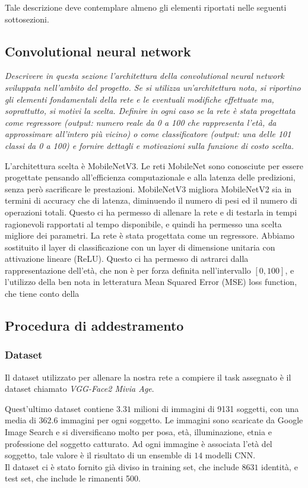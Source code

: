 Tale descrizione deve contemplare almeno gli elementi riportati nelle seguenti
sottosezioni.

\subsection{Convolutional neural network}
\emph{Descrivere in questa sezione l’architettura della convolutional neural network
sviluppata nell’ambito del progetto. Se si utilizza un’architettura nota, si riportino gli elementi fondamentali della rete e le eventuali modifiche effettuate ma, soprattutto, si motivi la scelta.
Definire in ogni caso se la rete è stata progettata come regressore (output:
numero reale da 0 a 100 che rappresenta l’età, da approssimare all’intero più
vicino) o come classificatore (output: una delle 101 classi da 0 a 100) e fornire dettagli e motivazioni sulla funzione di costo scelta.}

L'architettura scelta è MobileNetV3. Le reti MobileNet sono conosciute per essere progettate pensando all'efficienza computazionale e alla latenza delle predizioni, senza però sacrificare le prestazioni. MobileNetV3 migliora MobileNetV2 sia in termini di accuracy che di latenza, diminuendo il numero di pesi ed il numero di operazioni totali. Questo ci ha permesso di allenare la rete e di testarla in tempi ragionevoli rapportati al tempo disponibile, e quindi ha permesso una scelta migliore dei parametri.
La rete è stata progettata come un regressore. Abbiamo sostituito il layer di classificazione con un layer di dimensione unitaria con attivazione lineare (ReLU). Questo ci ha permesso di astrarci dalla rappresentazione dell'età, che non è per forza definita nell'intervallo \([0, 100]\), e l'utilizzo della ben nota in letteratura Mean Squared Error (MSE) loss function, che tiene conto della

\subsection{Procedura di addestramento}
\subsubsection{Dataset}

Il dataset utilizzato per allenare la nostra rete a compiere il task assegnato è il dataset chiamato \emph{VGG-Face2 Mivia Age}.

Quest'ultimo dataset contiene $3.31$ milioni di immagini di 9131 soggetti, con una media di $362.6$ immagini per ogni soggetto. Le immagini sono scaricate da Google Image Search e si diversificano molto per posa, età, illuminazione, etnia e professione del soggetto catturato. Ad ogni immagine è associata l'età del soggetto, tale valore è il risultato di un ensemble di $14$ modelli CNN.\\
Il dataset ci è stato fornito già diviso in training set, che include $8631$ identità, e test set, che include le rimanenti 500.

